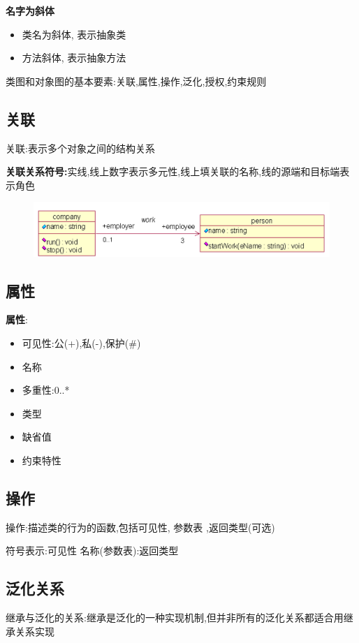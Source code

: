 \documentclass[UTF8,a4paper]{ctexart}
\begin{document}
\textbf{名字为斜体}
\begin{itemize}
  \item 类名为斜体, 表示抽象类
  \item 方法斜体, 表示抽象方法
\end{itemize}

类图和对象图的基本要素:关联,属性,操作,泛化,授权,约束规则

\subsection{关联}

关联:表示多个对象之间的结构关系

\textbf{关联关系符号:}实线,线上数字表示多元性,线上填关联的名称,线的源端和目标端表示角色

\begin{figure}[H]
  \centering
  \includegraphics[scale = 0.3]{assets/SoftwareEngineering_9a276.png}
\end{figure}

\subsection{属性}

\textbf{属性}:
\begin{itemize}
  \item 可见性:公(+),私(-),保护(\#)
  \item 名称
  \item 多重性:0..*
  \item 类型
  \item 缺省值
  \item 约束特性
\end{itemize}

\subsection{操作}
操作:描述类的行为的函数,包括可见性, 参数表 ,返回类型(可选)

符号表示:可见性 名称(参数表):返回类型

\subsection{泛化关系}
继承与泛化的关系:继承是泛化的一种实现机制,但并非所有的泛化关系都适合用继承关系实现
\end{document}
